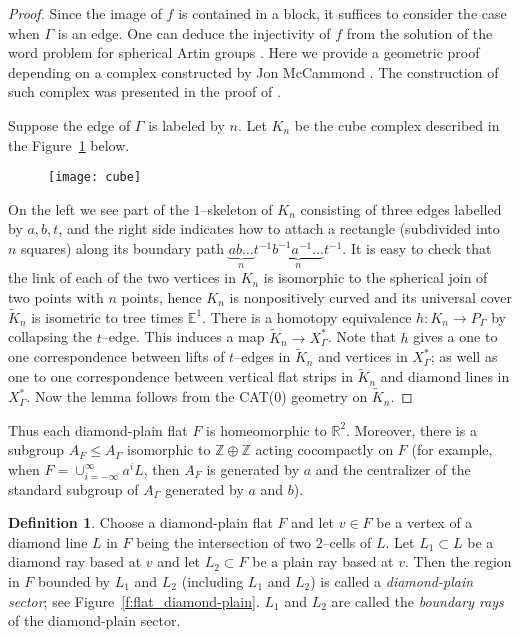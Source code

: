 \documentclass[11pt]{amsart}
\theoremstyle{definition}
\newtheorem{definition}[theorem]{Definition}
\newcommand{\Xa}{X^{\ast}}
\begin{document}
\begin{proof}
Since the image of $f$ is contained in a block, it suffices to consider the case when $\Gamma$ is an edge. One can deduce the injectivity of $f$ from the solution of the word problem for spherical Artin groups \cite{brieskorn1972artin,deligne}. Here we provide a geometric proof depending on a complex constructed by Jon McCammond \cite{McCammond2010}. The construction of such complex was presented in the proof of \cite[Theorem 5.1]{huang2015cocompactly}.

Suppose the edge of $\Gamma$ is labeled by $n$. Let $K_n$ be the cube complex described in the Figure~\ref{f:cube} below.
\begin{figure}[h!]
	\centering
	\texttt{[image: cube]}
	\caption{}
	\label{f:cube}
\end{figure}
On the left we see part of the $1$--skeleton of $K_n$ consisting of
three edges labelled by $a,b,t$, and the right side indicates
how to attach a rectangle (subdivided into $n$ squares)
along its boundary path $\underbrace{ab\dots}_{n}t^{-1}
\underbrace{ b^{-1} a^{-1}\dots}_{n}t^{-1}$. It is easy
to check that the link of each of the two vertices in $K_n$ is
isomorphic to the spherical join of two points with $n$ points,
hence $K_n$ is nonpositively curved and its universal cover $\widetilde K_n$ is isometric to tree times $\mathbb E^1$. There is a homotopy equivalence $h\colon K_n\to P_\Gamma$ by collapsing the $t$--edge. This induces a map $\widetilde{K}_n\to\Xa_\Gamma$. Note that $h$ gives a one to one correspondence between lifts of $t$--edges in $\widetilde{K}_n$ and vertices in $\Xa_\Gamma$; as well as one to one correspondence between vertical flat strips in $\widetilde{K}_n$ and diamond lines in $\Xa_\Gamma$. Now the lemma follows from the CAT(0) geometry on $\widetilde{K}_n$.
\end{proof}

Thus each diamond-plain flat $F$ is homeomorphic to $\mathbb R^2$. Moreover, there is a subgroup $A_F\le A_\Gamma$ isomorphic to $\mathbb Z \oplus\mathbb Z$ acting cocompactly on $F$ (for example, when $F=\cup_{i=-\infty}^{\infty} a^i L$, then $A_F$ is generated by $a$ and the centralizer of the standard subgroup of $A_\Gamma$ generated by $a$ and $b$). 

\begin{definition}
		\label{def:diamond-plain sector}
Choose a diamond-plain flat $F$ and let $v\in F$ be a vertex of a diamond line $L$ in $F$ being the intersection of two $2$--cells of $L$. Let $L_1\subset L$ be a diamond ray based at $v$ and let $L_2\subset F$ be a plain ray based at $v$. Then the region in $F$ bounded by $L_1$ and $L_2$ (including $L_1$ and $L_2$) is called a \emph{diamond-plain sector}; see Figure~\ref{f:flat_diamond-plain}. $L_1$ and $L_2$ are called the \emph{boundary rays} of the diamond-plain sector.
\end{definition}
\end{document}
